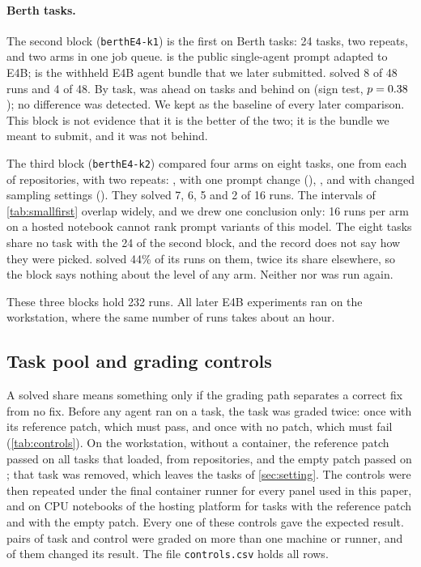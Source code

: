 \paragraph{Berth tasks.}
The second block (\texttt{berthE4-k1}) is the first on Berth tasks: 24 tasks, two repeats, and two arms in one job
queue.  is the public single-agent prompt adapted to E4B;  is the withheld E4B agent bundle that
we later submitted.  solved 8 of 48 runs and  4 of 48. By task,  was ahead on
\KOneBaseBetter{} tasks and behind on \KOneOtherBetter{} (sign test, $p = 0.38$); no difference was detected. We
kept  as the baseline of every later comparison. This block is not evidence that it is the better of the
two; it is the bundle we meant to submit, and it was not behind.

The third block (\texttt{berthE4-k2}) compared four arms on eight tasks, one from each of \KTwoRepos{} repositories,
with two repeats: ,  with one prompt change (), , and  with
changed sampling settings (). They solved 7, 6, 5 and 2 of 16 runs. The intervals of
\cref{tab:smallfirst} overlap widely, and we drew one conclusion only: 16 runs per arm on a hosted notebook cannot
rank prompt variants of this model. The eight tasks share no task with the 24 of the second block, and the record
does not say how they were picked.  solved 44\% of its runs on them, twice its share elsewhere, so the block
says nothing about the level of any arm. Neither  nor  was run again.

These three blocks hold 232 runs. All later E4B experiments ran on the workstation, where the same number of runs
takes about an hour.

\subsection{Task pool and grading controls}



A solved share means something only if the grading path separates a correct fix from no fix. Before any agent ran on
a task, the task was graded twice: once with its reference patch, which must pass, and once with no patch, which must
fail (\cref{tab:controls}). On the workstation, without a container, the reference patch passed on all
\PoolTasks{} tasks that loaded, from \PoolRepos{} repositories, and the empty patch passed on \PoolEmptyPass{}; that
task was removed, which leaves the \PoolValid{} tasks of \cref{sec:setting}. The controls were then repeated under the
final container runner for every panel used in this paper, and on CPU notebooks of the hosting platform for
\HostedCtrlRef{} tasks with the reference patch and \HostedCtrlEmpty{} with the empty patch. Every one of these
controls gave the expected result. \CtrlPairsMulti{} pairs of task and control were graded on more than one machine or
runner, and \CtrlPairsDisagree{} of them changed its result. The file \texttt{controls.csv} holds all \ControlRows{}
rows.

